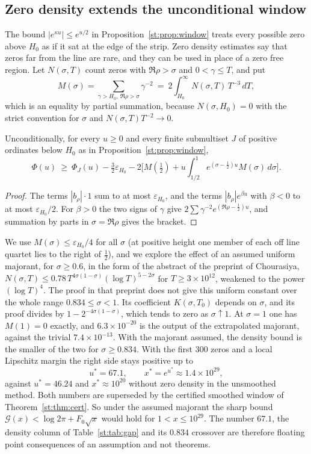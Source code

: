 \subsection{Zero density extends the unconditional window}
The bound $|e^{\kappa u}|\le e^{u/2}$ in Proposition~\ref{st:prop:window} treats every possible zero above $H_0$ as if it sat at the edge of the strip. Zero density estimates say that zeros far from the line are rare, and they can be used in place of a zero free region. Let $N(\sigma,T)$ count zeros with $\Re\rho>\sigma$ and $0<\gamma\le T$, and put
\[
M(\sigma)=\sum_{\gamma>H_0,\ \Re\rho>\sigma}\gamma^{-2}\ =\ 2\int_{H_0}^\infty N(\sigma,T)\,T^{-3}\,dT ,
\]
which is an equality by partial summation, because $N(\sigma,H_0)=0$ with the strict convention for $\sigma$ and $N(\sigma,T)T^{-2}\to0$.
\begin{theorem}\label{st:thm:density}
Unconditionally, for every $u\ge0$ and every finite submultiset $J$ of positive ordinates below $H_0$ as in Proposition~\ref{st:prop:window},
\[
\Phi(u)\ \ge\ \Phi_J(u)-\tfrac32\varepsilon_{H_0}-2\Big[M(\tfrac12)+u\int_{1/2}^1e^{(\sigma-\frac12)u}M(\sigma)\,d\sigma\Big].
\]
\end{theorem}
\begin{proof}
The terms $|b_\rho|\cdot1$ sum to at most $\varepsilon_{H_0}$, and the terms $|b_\rho|e^{\beta u}$ with $\beta<0$ to at most $\varepsilon_{H_0}/2$. For $\beta>0$ the two signs of $\gamma$ give $2\sum\gamma^{-2}e^{(\Re\rho-\frac12)u}$, and summation by parts in $\sigma=\Re\rho$ gives the bracket.
\end{proof}
We use $M(\sigma)\le\varepsilon_{H_0}/4$ for all $\sigma$ (at positive height one member of each off line quartet lies to the right of $\tfrac12$), and we explore the effect of an assumed uniform majorant, for $\sigma\ge0.6$, in the form of the abstract of the preprint of Chourasiya, $N(\sigma,T)\le0.78\,T^{4\sigma(1-\sigma)}(\log T)^{5-2\sigma}$ for $T\ge3\times10^{12}$, weakened to the power $(\log T)^4$. The proof in that preprint does not give this uniform constant over the whole range $0.834\le\sigma<1$. Its coefficient $K(\sigma,T_0)$ depends on $\sigma$, and its proof divides by $1-2^{-4\sigma(1-\sigma)}$, which tends to zero as $\sigma\uparrow1$. At $\sigma=1$ one has $M(1)=0$ exactly, and $6.3\times10^{-20}$ is the output of the extrapolated majorant, against the trivial $7.4\times10^{-13}$. With the majorant assumed, the density bound is the smaller of the two for $\sigma\ge0.834$. With the first 300 zeros and a local Lipschitz margin the right side stays positive up to
\[
u^*=67.1,\qquad x^*=e^{u^*}\approx1.4\times10^{29},
\]
against $u^*=46.24$ and $x^*\approx10^{20}$ without zero density in the unsmoothed method. Both numbers are superseded by the certified smoothed window of Theorem~\ref{st:thm:cert}. So under the assumed majorant the sharp bound $\mathcal G(x)<\log2\pi+F_0\sqrt x$ would hold for $1<x\le10^{29}$. The number $67.1$, the density column of Table~\ref{st:tab:gap} and its $0.834$ crossover are therefore floating point consequences of an assumption and not theorems.

